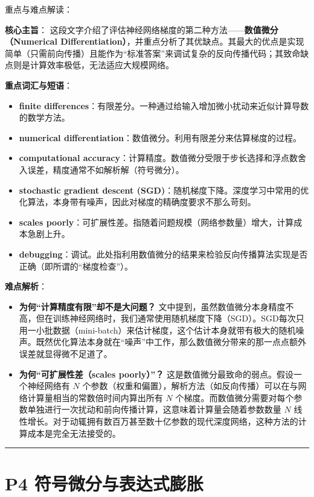 \documentclass{article}
\begin{document}
{\color{blue}
重点与难点解读：

\textbf{核心主旨}：
这段文字介绍了评估神经网络梯度的第二种方法——\textbf{数值微分（Numerical Differentiation）}，并重点分析了其优缺点。其最大的优点是实现简单（只需前向传播）且能作为“标准答案”来调试复杂的反向传播代码；其致命缺点则是计算效率极低，无法适应大规模网络。

\textbf{重点词汇与短语}：
\begin{itemize}
    \item \textbf{finite differences}：有限差分。一种通过给输入增加微小扰动来近似计算导数的数学方法。
    \item \textbf{numerical differentiation}：数值微分。利用有限差分来估算梯度的过程。
    \item \textbf{computational accuracy}：计算精度。数值微分受限于步长选择和浮点数舍入误差，精度通常不如解析解（符号微分）。
    \item \textbf{stochastic gradient descent (SGD)}：随机梯度下降。深度学习中常用的优化算法，本身带有噪声，因此对梯度的精确度要求不那么苛刻。
    \item \textbf{scales poorly}：可扩展性差。指随着问题规模（网络参数量）增大，计算成本急剧上升。
    \item \textbf{debugging}：调试。此处指利用数值微分的结果来检验反向传播算法实现是否正确（即所谓的“梯度检查”）。
\end{itemize}

\textbf{难点解析}：
\begin{itemize}
    \item \textbf{为何“计算精度有限”却不是大问题？} 文中提到，虽然数值微分本身精度不高，但在训练神经网络时，我们通常使用随机梯度下降（SGD）。SGD每次只用一小批数据（mini-batch）来估计梯度，这个估计本身就带有极大的随机噪声。既然优化算法本身就在“噪声”中工作，那么数值微分带来的那一点点额外误差就显得微不足道了。
    \item \textbf{为何“可扩展性差（scales poorly）”？} 这是数值微分最致命的弱点。假设一个神经网络有 $N$ 个参数（权重和偏置），解析方法（如反向传播）可以在与网络计算量相当的常数倍时间内算出所有 $N$ 个梯度。而数值微分需要对每个参数单独进行一次扰动和前向传播计算，这意味着计算量会随着参数数量 $N$ 线性增长。对于动辄拥有数百万甚至数十亿参数的现代深度网络，这种方法的计算成本是完全无法接受的。
\end{itemize}
}

\noindent\rule{\linewidth}{0.4pt}

\section{P4 符号微分与表达式膨胀}
\end{document}
